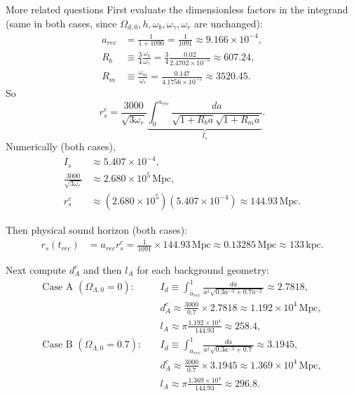 \begin{example}{More related questions}{}
    First evaluate the dimensionless factors in the integrand (same in both cases, since $\Omega_{d,0},h,\omega_b,\omega_\gamma,\omega_r$ are unchanged):
    \begin{align*}
        a_{rec}&=\frac{1}{1+1090}=\frac{1}{1091}\approx 9.166\times10^{-4}, \\
        R_b&\equiv \frac{3}{4}\frac{\omega_b}{\omega_\gamma}
        =\frac{3}{4}\frac{0.02}{2.4702\times10^{-5}}
        \approx 607.24, \\
        R_m&\equiv \frac{\omega_m}{\omega_r}
        =\frac{0.147}{4.1756\times10^{-5}}
        \approx 3520.45.
    \end{align*}
    So
    \[
        r_s^c=\frac{3000}{\sqrt{3\omega_r}}\underbrace{\int_0^{a_{rec}}\frac{da}{\sqrt{1+R_ba}\sqrt{1+R_ma}}}_{I_s}.
    \]
    Numerically (both cases),
    \begin{align*}
        I_s&\approx 5.407\times10^{-4}, \\
        \frac{3000}{\sqrt{3\omega_r}}&\approx 2.680\times10^5\,\mathrm{Mpc}, \\
        r_s^c&\approx \left(2.680\times10^5\right)\left(5.407\times10^{-4}\right)
        \approx 144.93\,\mathrm{Mpc}.
    \end{align*}

    Then physical sound horizon (both cases):
    \begin{align*}
        r_s(t_{rec})&=a_{rec}r_s^c
        =\frac{1}{1091}\times 144.93\,\mathrm{Mpc}
        \approx 0.13285\,\mathrm{Mpc}
        \approx 133\,\mathrm{kpc}.
    \end{align*}

    Next compute $d_A^c$ and then $l_A$ for each background geometry:
    \begin{align*}
        \text{Case A }(\Omega_{\Lambda,0}=0):\quad
        &I_d\equiv\int_{a_{rec}}^1\frac{da}{a^2\sqrt{0.3a^{-3}+0.7a^{-2}}}\approx 2.7818, \\
        &d_A^c\approx \frac{3000}{0.7}\times 2.7818 \approx 1.192\times10^4\,\mathrm{Mpc},
        \\
        &l_A\approx \pi\frac{1.192\times10^4}{144.93}\approx 258.4, \\
        \text{Case B }(\Omega_{\Lambda,0}=0.7):\quad
        &I_d\equiv\int_{a_{rec}}^1\frac{da}{a^2\sqrt{0.3a^{-3}+0.7}}\approx 3.1945, \\
        &d_A^c\approx \frac{3000}{0.7}\times 3.1945 \approx 1.369\times10^4\,\mathrm{Mpc},
        \\
        &l_A\approx \pi\frac{1.369\times10^4}{144.93}\approx 296.8.
    \end{align*}


\end{example}
